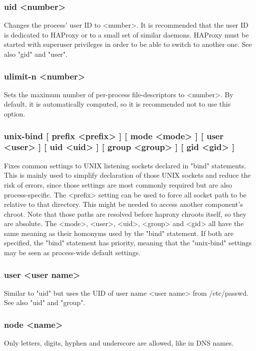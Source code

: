 \subsubsection[uid]{uid <number>}
  Changes the process' user ID to <number>. It is recommended that the user ID
  is dedicated to HAProxy or to a small set of similar daemons. HAProxy must
  be started with superuser privileges in order to be able to switch to another
  one. See also "gid" and "user".

\subsubsection[ulimit-n]{ulimit-n <number>}
  Sets the maximum number of per-process file-descriptors to <number>. By
  default, it is automatically computed, so it is recommended not to use this
  option.

\subsubsection[unix-bind]{unix-bind [ prefix <prefix> ] [ mode <mode> ] [ user <user> ] [ uid <uid> ] [ group <group> ] [ gid <gid> ]}

  Fixes common settings to UNIX listening sockets declared in "bind" statements.
  This is mainly used to simplify declaration of those UNIX sockets and reduce
  the risk of errors, since those settings are most commonly required but are
  also process-specific. The <prefix> setting can be used to force all socket
  path to be relative to that directory. This might be needed to access another
  component's chroot. Note that those paths are resolved before haproxy chroots
  itself, so they are absolute. The <mode>, <user>, <uid>, <group> and <gid>
  all have the same meaning as their homonyms used by the "bind" statement. If
  both are specified, the "bind" statement has priority, meaning that the
  "unix-bind" settings may be seen as process-wide default settings.

\subsubsection[user]{user <user name>}
  Similar to "uid" but uses the UID of user name <user name> from /etc/passwd.
  See also "uid" and "group".

\subsubsection[node]{node <name>}
  Only letters, digits, hyphen and underscore are allowed, like in DNS names.

